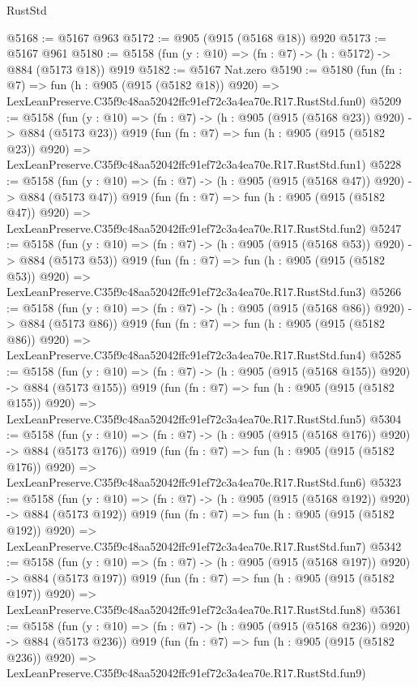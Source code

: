 \begin{lexlean}{RustStd}
\begin{coremodule}
@5168 := @5167 @963
@5172 := @905 (@915 (@5168 @18)) @920
@5173 := @5167 @961
@5180 := @5158 (fun (y : @10) => (fn : @7) -> (h : @5172) -> @884 (@5173 @18)) @919
@5182 := @5167 Nat.zero
@5190 := @5180
    (fun (fn : @7) =>
    fun (h : @905 (@915 (@5182 @18)) @920) =>
    LexLeanPreserve.C35f9c48aa52042ffc91ef72c3a4ea70e.R17.RustStd.fun0)
@5209 := @5158
    (fun (y : @10) => (fn : @7) -> (h : @905 (@915 (@5168 @23)) @920) -> @884 (@5173 @23))
    @919
    (fun (fn : @7) =>
    fun (h : @905 (@915 (@5182 @23)) @920) =>
    LexLeanPreserve.C35f9c48aa52042ffc91ef72c3a4ea70e.R17.RustStd.fun1)
@5228 := @5158
    (fun (y : @10) => (fn : @7) -> (h : @905 (@915 (@5168 @47)) @920) -> @884 (@5173 @47))
    @919
    (fun (fn : @7) =>
    fun (h : @905 (@915 (@5182 @47)) @920) =>
    LexLeanPreserve.C35f9c48aa52042ffc91ef72c3a4ea70e.R17.RustStd.fun2)
@5247 := @5158
    (fun (y : @10) => (fn : @7) -> (h : @905 (@915 (@5168 @53)) @920) -> @884 (@5173 @53))
    @919
    (fun (fn : @7) =>
    fun (h : @905 (@915 (@5182 @53)) @920) =>
    LexLeanPreserve.C35f9c48aa52042ffc91ef72c3a4ea70e.R17.RustStd.fun3)
@5266 := @5158
    (fun (y : @10) => (fn : @7) -> (h : @905 (@915 (@5168 @86)) @920) -> @884 (@5173 @86))
    @919
    (fun (fn : @7) =>
    fun (h : @905 (@915 (@5182 @86)) @920) =>
    LexLeanPreserve.C35f9c48aa52042ffc91ef72c3a4ea70e.R17.RustStd.fun4)
@5285 := @5158
    (fun (y : @10) => (fn : @7) -> (h : @905 (@915 (@5168 @155)) @920) -> @884 (@5173 @155))
    @919
    (fun (fn : @7) =>
    fun (h : @905 (@915 (@5182 @155)) @920) =>
    LexLeanPreserve.C35f9c48aa52042ffc91ef72c3a4ea70e.R17.RustStd.fun5)
@5304 := @5158
    (fun (y : @10) => (fn : @7) -> (h : @905 (@915 (@5168 @176)) @920) -> @884 (@5173 @176))
    @919
    (fun (fn : @7) =>
    fun (h : @905 (@915 (@5182 @176)) @920) =>
    LexLeanPreserve.C35f9c48aa52042ffc91ef72c3a4ea70e.R17.RustStd.fun6)
@5323 := @5158
    (fun (y : @10) => (fn : @7) -> (h : @905 (@915 (@5168 @192)) @920) -> @884 (@5173 @192))
    @919
    (fun (fn : @7) =>
    fun (h : @905 (@915 (@5182 @192)) @920) =>
    LexLeanPreserve.C35f9c48aa52042ffc91ef72c3a4ea70e.R17.RustStd.fun7)
@5342 := @5158
    (fun (y : @10) => (fn : @7) -> (h : @905 (@915 (@5168 @197)) @920) -> @884 (@5173 @197))
    @919
    (fun (fn : @7) =>
    fun (h : @905 (@915 (@5182 @197)) @920) =>
    LexLeanPreserve.C35f9c48aa52042ffc91ef72c3a4ea70e.R17.RustStd.fun8)
@5361 := @5158
    (fun (y : @10) => (fn : @7) -> (h : @905 (@915 (@5168 @236)) @920) -> @884 (@5173 @236))
    @919
    (fun (fn : @7) =>
    fun (h : @905 (@915 (@5182 @236)) @920) =>
    LexLeanPreserve.C35f9c48aa52042ffc91ef72c3a4ea70e.R17.RustStd.fun9)

\end{coremodule}
\end{lexlean}
